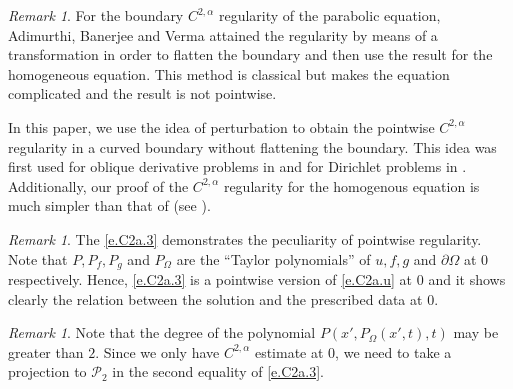 \documentclass[preprint,12pt]{elsarticle}
\theoremstyle{definition}
\theoremstyle{remark}
\newtheorem{remark}[theorem]{Remark}
\numberwithin{equation}{section}
\begin{document}
\begin{remark}\label{re.C2a1}
For the boundary $C^{2,\alpha}$ regularity of the parabolic equation, Adimurthi, Banerjee and Verma \cite{MR4073515} attained the regularity by means of a transformation in order to flatten the boundary and then use the result for the homogeneous equation. This method is classical but makes the equation complicated and the result is not pointwise.

In this paper, we use the idea of perturbation to obtain the pointwise $C^{2,\alpha}$ regularity in a curved boundary without flattening the boundary. This idea was first used for oblique derivative problems in \cite{MR3780142} and for Dirichlet problems in \cite{MR4088470}. Additionally, our proof of the $C^{2,\alpha}$ regularity for the homogenous equation is much simpler than that of \cite{MR4073515} (see ).
\end{remark}

\begin{remark}\label{re1.6}
The \cref{e.C2a.3} demonstrates the peculiarity of pointwise regularity. Note that $P,P_f,P_g$ and $P_{\Omega}$ are the ``Taylor polynomials'' of $u,f,g$ and $\partial\Omega$ at $0$ respectively. Hence, \cref{e.C2a.3} is a pointwise version of \cref{e.C2a.u} at $0$ and it shows clearly the relation between the solution and the prescribed data at $0$.
\end{remark}

\begin{remark}\label{re1.7}
Note that the degree of the polynomial $P(x',P_{\Omega}(x',t),t)$ may be greater than $2$. Since we only have $C^{2,\alpha}$ estimate at $0$, we need to take a projection to $\mathcal{P}_2$ in the second equality of \cref{e.C2a.3}.
\end{remark}
~\\

\end{document}

